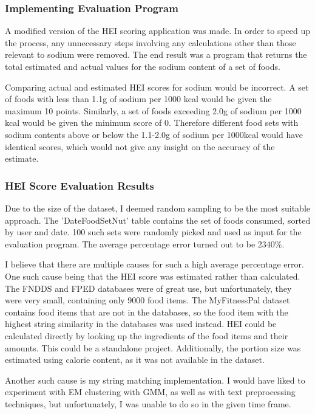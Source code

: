 \documentclass{article}
\begin{document}
\subsubsection{Implementing Evaluation Program}
A modified version of the HEI scoring application was made. In order to speed up the process, any unnecessary steps involving any calculations other than those relevant to sodium were removed. The end result was a program that returns the total estimated and actual values for the sodium content of a set of foods. 

\bigskip
\noindent Comparing actual and estimated HEI scores for sodium would be incorrect. A set of foods with less than 1.1g of sodium per 1000 kcal would be given the maximum 10 points. Similarly, a set of foods exceeding 2.0g of sodium per 1000 kcal would be given the minimum score of 0. Therefore different food sets with sodium contents above or below the 1.1-2.0g of sodium per 1000kcal would have identical scores, which would not give any insight on the accuracy of the estimate. 

\subsubsection{HEI Score Evaluation Results}
Due to the size of the dataset, I deemed random sampling to be the most suitable approach. The 'DateFoodSetNut' table contains the set of foods consumed, sorted by user and date. 100 such sets were randomly picked and used as input for the evaluation program. The average percentage error turned out to be 2340\%. 

\bigskip
\noindent I believe that there are multiple causes for such a high average percentage error. One such cause being that the HEI score was estimated rather than calculated. The FNDDS and FPED databases were of great use, but unfortunately, they were very small, containing only 9000 food items. The MyFitnessPal dataset \cite{diet_success_predictions} contains food items that are not in the databases, so the food item with the highest string similarity in the databases was used instead. HEI could be calculated directly by looking up the ingredients of the food items and their amounts. This could be a standalone project. Additionally, the portion size was estimated using calorie content, as it was not available in the dataset. 

\bigskip
\noindent Another such cause is my string matching implementation. I would have liked to experiment with EM clustering with GMM, as well as with text preprocessing techniques, but unfortunately, I was unable to do so in the given time frame.
\end{document}
